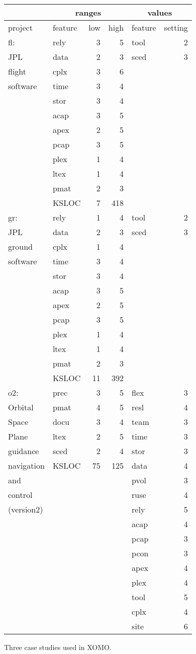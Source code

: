 \begin{wrapfigure}{r}{1.75in}
\scriptsize
\begin{tabular}{l|lrr|lr}
       &\multicolumn{3}{c|}{ranges}      &\multicolumn{2}{c}{values}\\\hline
project&feature&low&high&feature&setting\\\hline


fl:&rely&3&5&tool&2\\
JPL &data&2&3&sced&3\\
flight&cplx&3&6&&\\
software&time&3&4&&\\
&stor&3&4&&\\
&acap&3&5&&\\
&apex&2&5&&\\
&pcap&3&5&&\\
&plex&1&4&&\\
&ltex&1&4&&\\
&pmat&2&3&&\\
&KSLOC&7&418&&\\\hline
gr:&rely&1&4&tool&2\\
JPL &data&2&3&sced&3\\
ground&cplx&1&4&&\\
software&time&3&4&&\\
&stor&3&4&&\\
&acap&3&5&&\\
&apex&2&5&&\\
&pcap&3&5&&\\
&plex&1&4&&\\
&ltex&1&4&&\\
&pmat&2&3&&\\
&KSLOC&11&392&&\\\hline
o2:&prec&3&5&flex&3\\
Orbital &pmat&4&5&resl&4\\
Space&docu&3&4&team&3\\
Plane&ltex&2&5&time&3\\
guidance&sced&2&4&stor&3\\
navigation&KSLOC&75&125&data&4\\
and&&&&pvol&3\\
control&&&&ruse&4\\
(version2)&&&&rely&5\\
&&&&acap&4\\
&&&&pcap&3\\
&&&&pcon&3\\
&&&&apex&4\\
&&&&plex&4\\
&&&&tool&5\\
&&&&cplx&4\\
&&&&site&6\\
\end{tabular}
\caption{Three case studies used in XOMO.}\label{fig:xomocases}
\end{wrapfigure}

